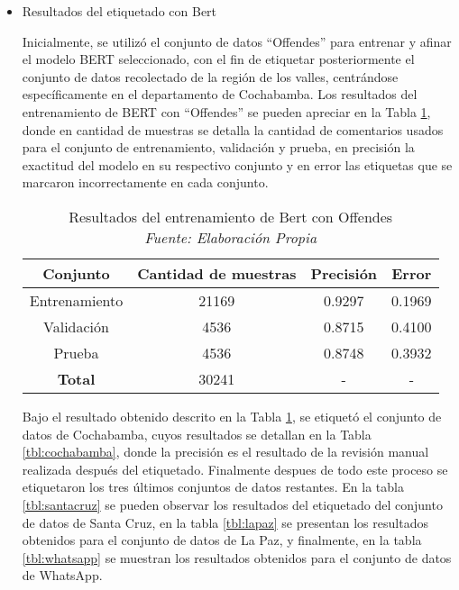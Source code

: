 \begin{itemize}
 \item{Resultados del etiquetado con Bert}

Inicialmente, se utilizó el conjunto de datos ``Offendes'' para entrenar y afinar  el modelo BERT seleccionado, con el fin de etiquetar posteriormente el conjunto de datos recolectado de la región de los valles, centrándose específicamente en el departamento de Cochabamba. Los resultados del entrenamiento de BERT con ``Offendes'' se pueden apreciar en la Tabla \ref{tbl:bert}, donde en cantidad de muestras se detalla la cantidad de comentarios usados para el conjunto de entrenamiento, validación y prueba, en precisión la exactitud del modelo en su respectivo conjunto y en error las etiquetas que se marcaron incorrectamente en cada conjunto.

\begin{table}[!ht]
	\centering
	\begin{tabular}{|c|c|c|c|}
		\hline
		\textbf{Conjunto} & \textbf{Cantidad de muestras} & \textbf{Precisión} & \textbf{Error} \\ \hline
		Entrenamiento & 21169 & 0.9297 & 0.1969 \\ 
		Validación & 4536 & 0.8715 & 0.4100 \\ 
		Prueba & 4536 & 0.8748 & 0.3932 \\ \hline
		\textbf{Total} & 30241 & - & - \\ \hline
	\end{tabular}
	\caption[Resultados del entrenamiento de Bert con Offendes]{Resultados del entrenamiento de Bert con Offendes
		\\\textit{Fuente: Elaboración Propia}}
	\label{tbl:bert}
\end{table}


Bajo el resultado obtenido descrito en la Tabla \ref{tbl:bert}, se etiquetó el conjunto de datos de Cochabamba, cuyos resultados se detallan en la Tabla \ref{tbl:cochabamba}, donde la precisión es el resultado de la revisión manual realizada después del etiquetado. Finalmente despues de todo este proceso se etiquetaron los tres últimos conjuntos de datos restantes. En la tabla \ref{tbl:santacruz} se pueden observar los resultados del etiquetado del conjunto de datos de Santa Cruz, en la tabla \ref{tbl:lapaz} se presentan los resultados obtenidos para el conjunto de datos de La Paz, y finalmente, en la tabla \ref{tbl:whatsapp} se muestran los resultados obtenidos para el conjunto de datos de WhatsApp.



\end{itemize}
